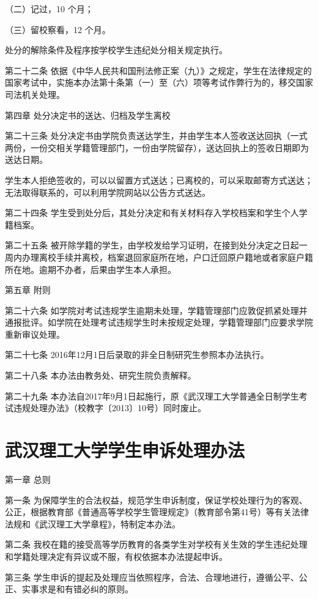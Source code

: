 \documentclass[UTF8,12pt,a4paper]{report}
\begin{document}
（二）记过，10 个月；

（三）留校察看，12 个月。

处分的解除条件及程序按学校学生违纪处分相关规定执行。

第二十二条  依据《中华人民共和国刑法修正案（九）》之规定，学生在法律规定的国家考试中，实施本办法第十条第（一）至（六）项等考试作弊行为的，移交国家司法机关处理。



第四章  处分决定书的送达、归档及学生离校

第二十三条  处分决定书由学院负责送达学生，并由学生本人签收送达回执（一式两份，一份交相关学籍管理部门，一份由学院留存），送达回执上的签收日期即为送达日期。

学生本人拒绝签收的，可以以留置方式送达；已离校的，可以采取邮寄方式送达；无法取得联系的，可以利用学院网站以公告方式送达。

第二十四条  学生受到处分后，其处分决定和有关材料存入学校档案和学生个人学籍档案。

第二十五条  被开除学籍的学生，由学校发给学习证明，在接到处分决定之日起一周内办理离校手续并离校，档案退回家庭所在地，户口迁回原户籍地或者家庭户籍所在地。逾期不办者，后果由学生本人承担。



第五章  附则

第二十六条  如学院对考试违规学生逾期未处理，学籍管理部门应敦促抓紧处理并通报批评。如学院在处理考试违规学生时未按规定处理，学籍管理部门应要求学院重新审议处理。

第二十七条  2016年12月1日后录取的非全日制研究生参照本办法执行。

第二十八条  本办法由教务处、研究生院负责解释。

第二十九条  本办法自2017年9月1日起施行，原《武汉理工大学普通全日制学生考试违规处理办法》（校教字〔2013〕10号）同时废止。

\chapter{武汉理工大学学生申诉处理办法}
第一章  总则

第一条  为保障学生的合法权益，规范学生申诉制度，保证学校处理行为的客观、公正，根据教育部《普通高等学校学生管理规定》（教育部令第41号）等有关法律法规和《武汉理工大学章程》，特制定本办法。

第二条  我校在籍的接受高等学历教育的各类学生对学校有关生效的学生违纪处理和学籍处理决定有异议或不服，有权依据本办法提起申诉。

第三条  学生申诉的提起及处理应当依照程序，合法、合理地进行，遵循公平、公正、实事求是和有错必纠的原则。
\end{document}
